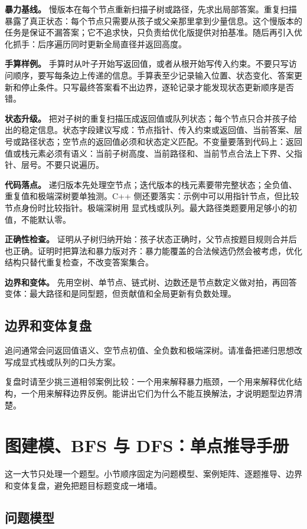 \textbf{暴力基线。} 慢版本在每个节点重新扫描子树或路径，先求出局部答案。重复扫描暴露了真正状态：每个节点只需要从孩子或父亲那里拿到少量信息。这个慢版本的任务是保证不漏答案；它不追求快，只负责给优化版提供对拍基准。随后再引入优化抓手：后序遍历同时更新全局直径并返回高度。

\textbf{手算样例。} 手算时从叶子开始写返回值，或者从根开始写传入约束。不要只写访问顺序，要写每条边上传递的信息。手算表至少记录输入位置、状态变化、答案更新和停止条件。只写最终答案看不出边界，逐轮记录才能发现状态更新顺序是否错。

\textbf{状态升级。} 把对子树的重复扫描压成返回值或队列状态；每个节点只合并孩子给出的稳定信息。状态字段建议写成：节点指针、传入约束或返回值、当前答案、层号或路径状态；空节点的返回值必须和状态定义匹配。不变量要落到代码上：返回值或栈元素必须有语义：当前子树高度、当前路径和、当前节点合法上下界、父指针、层号。不要只说遍历。

\textbf{代码落点。} 递归版本先处理空节点；迭代版本的栈元素要带完整状态；全负值、重复值和极端深树要单独测。C++ 侧还要落实：示例中可以用指针节点，但比较节点身份时比较指针。极端深树用  显式栈或队列。最大路径类题要用足够小的初值，不能默认零。

\textbf{正确性检查。} 证明从子树归纳开始：孩子状态正确时，父节点按题目规则合并后也正确。证明时把算法和暴力版对齐：暴力能覆盖的合法候选仍然会被考虑，优化结构只替代重复检查，不改变答案集合。

\textbf{边界和变体。} 先用空树、单节点、链式树、边数还是节点数定义做对拍，再回答变体：最大路径和是同型题，但贡献值和全局更新有负数处理。

\subsection{边界和变体复盘}

追问通常会问返回值语义、空节点初值、全负数和极端深树。请准备把递归思想改写成显式栈或队列的口头方案。

复盘时请至少挑三道相邻案例比较：一个用来解释暴力瓶颈，一个用来解释优化结构，一个用来解释边界反例。能讲出它们为什么不能互换解法，才说明题型边界清楚。

\section{图建模、BFS 与 DFS：单点推导手册}
这一大节只处理一个题型。小节顺序固定为问题模型、案例矩阵、逐题推导、边界和变体复盘，避免把题目标题变成一堵墙。

\subsection{问题模型}

